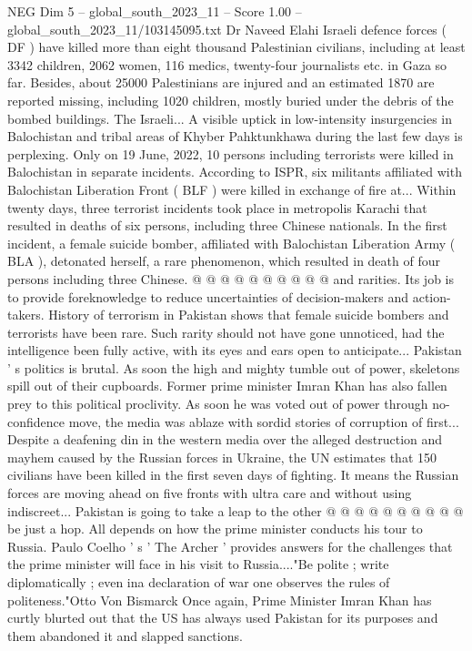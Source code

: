 \begin{textsample}{NEG Dim 5 – global\_south\_2023\_11 – Score 1.00 – global\_south\_2023\_11/103145095.txt}  \label{ex:f5_neg_179}
Dr Naveed Elahi Israeli defence forces ( DF ) have killed more than eight thousand Palestinian civilians, including at least 3342 children, 2062 women, 116 medics, twenty-four journalists etc. in Gaza so far.
Besides, about 25000 Palestinians are injured and an estimated 1870 are reported missing, including 1020 children, mostly buried under the debris of the bombed buildings.
The Israeli...
A visible uptick in low-intensity insurgencies in Balochistan and tribal areas of Khyber Pahktunkhawa during the last few days is perplexing.
Only on 19 June, 2022, 10 persons including terrorists were killed in Balochistan in separate incidents.
According to ISPR, six militants affiliated with Balochistan Liberation Front ( BLF ) were killed in exchange of fire at...
Within twenty days, three terrorist incidents took place in metropolis Karachi that resulted in deaths of six persons, including three Chinese nationals.
In the first incident, a female suicide bomber, affiliated with Balochistan Liberation Army ( BLA ), detonated herself, a rare phenomenon, which resulted in death of four persons including three Chinese. @ @ @ @ @ @ @ @ @ @ and rarities.
Its job is to provide foreknowledge to reduce uncertainties of decision-makers and action-takers.
History of terrorism in Pakistan shows that female suicide bombers and terrorists have been rare.
Such rarity should not have gone unnoticed, had the intelligence been fully active, with its eyes and ears open to anticipate...
Pakistan ' s politics is brutal.
As soon the high and mighty tumble out of power, skeletons spill out of their cupboards.
Former prime minister Imran Khan has also fallen prey to this political proclivity.
As soon he was voted out of power through no-confidence move, the media was ablaze with sordid stories of corruption of first...
Despite a deafening din in the western media over the alleged destruction and mayhem caused by the Russian forces in Ukraine, the UN estimates that 150 civilians have been killed in the first seven days of fighting.
It means the Russian forces are moving ahead on five fronts with ultra care and without using indiscreet...
Pakistan is going to take a leap to the other @ @ @ @ @ @ @ @ @ @ be just a hop.
All depends on how the prime minister conducts his tour to Russia.
Paulo Coelho ' s ' The Archer ' provides answers for the challenges that the prime minister will face in his visit to Russia...."Be polite ; write diplomatically ; even ina declaration of war one observes the rules of politeness."Otto Von Bismarck Once again, Prime Minister Imran Khan has curtly blurted out that the US has always used Pakistan for its purposes and them abandoned it and slapped sanctions.

\end{textsample}
